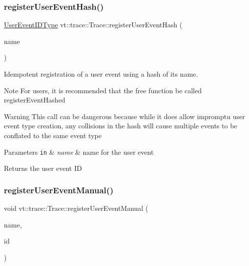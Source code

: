 \subsubsection{\texorpdfstring{register\+User\+Event\+Hash()}{registerUserEventHash()}}
{\footnotesize\ttfamily \hyperlink{namespacevt_1_1trace_a5908920d051c144c89f17c69ed262350}{User\+Event\+I\+D\+Type} vt\+::trace\+::\+Trace\+::register\+User\+Event\+Hash (\begin{DoxyParamCaption}\item[{std\+::string const \&}]{name }\end{DoxyParamCaption})}



Idempotent registration of a user event using a hash of its name. 

\begin{DoxyNote}{Note}
For users, it is recommended that the free function be called {\ttfamily register\+Event\+Hashed} 
\end{DoxyNote}
\begin{DoxyWarning}{Warning}
This call can be dangerous because while it does allow impromptu user event type creation, any collisions in the hash will cause multiple events to be conflated to the same event type
\end{DoxyWarning}

\begin{DoxyParams}[1]{Parameters}
\mbox{\tt in}  & {\em name} & name for the user event\\
\hline
\end{DoxyParams}
\begin{DoxyReturn}{Returns}
the user event ID 
\end{DoxyReturn}
\mbox{\label{structvt_1_1trace_1_1_trace_ade8d39718f60924f1aeb178ccda56cbc}} 
\subsubsection{\texorpdfstring{register\+User\+Event\+Manual()}{registerUserEventManual()}}
{\footnotesize\ttfamily void vt\+::trace\+::\+Trace\+::register\+User\+Event\+Manual (\begin{DoxyParamCaption}\item[{std\+::string const \&}]{name,  }\item[{\hyperlink{namespacevt_1_1trace_a70c43e0e1596eea236912d4197d3120a}{User\+Spec\+Event\+I\+D\+Type}}]{id }\end{DoxyParamCaption})}



